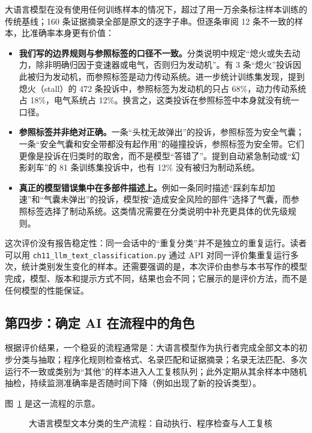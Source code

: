 大语言模型在没有使用任何训练样本的情况下，超过了用一万余条标注样本训练的传统基线；160 条证据摘录全部是原文的逐字子串。但逐条审阅 12 条不一致的样本，比准确率本身更有价值：

\begin{itemize}
  \item \textbf{我们写的边界规则与参照标签的口径不一致。}分类说明中规定“熄火或失去动力，除非明确归因于变速器或电气，否则归为发动机”。有 3 条“熄火”投诉因此被归为发动机，而参照标签是动力传动系统。进一步统计训练集发现，提到熄火（stall）的 472 条投诉中，参照标签为发动机的只占 68\%，动力传动系统占 18\%，电气系统占 12\%。换言之，这类投诉在参照标签中本身就没有统一口径。
  \item \textbf{参照标签并非绝对正确。}一条“头枕无故弹出”的投诉，参照标签为安全气囊；一条“安全气囊和安全带都没有起作用”的碰撞投诉，参照标签为安全带。它们更像是投诉在归类时的取舍，而不是模型“答错了”。提到自动紧急制动或“幻影刹车”的 81 条训练集投诉中，也有 12\% 没有被归为制动系统。
  \item \textbf{真正的模型错误集中在多部件描述上。}例如一条同时描述“踩刹车却加速”和“气囊未弹出”的投诉，模型按“造成安全风险的部件”选择了气囊，而参照标签选择了制动系统。这类情况需要在分类说明中补充更具体的优先级规则。
\end{itemize}

这次评价没有报告稳定性：同一会话中的“重复分类”并不是独立的重复运行。读者可以用 \texttt{ch11\_llm\_text\_classification.py} 通过 API 对同一评价集重复运行多次，统计类别发生变化的样本。还需要强调的是，本次评价由参与本书写作的模型完成，模型、版本和提示方式不同，结果也会不同；它展示的是评价方法，而不是任何模型的性能保证。

\subsection{第四步：确定 AI 在流程中的角色}

根据评价结果，一个稳妥的流程通常是：大语言模型作为执行者完成全部文本的初步分类与抽取；程序化规则检查格式、名录匹配和证据摘录；名录无法匹配、多次运行不一致或类别为“其他”的样本进入人工复核队列；此外定期从其余样本中随机抽检，持续监测准确率是否随时间下降（例如出现了新的投诉类型）。

图~\ref{fig:ch11_review} 是这一流程的示意。

\begin{figure}[H]
  \centering
  \caption{大语言模型文本分类的生产流程：自动执行、程序检查与人工复核}
  \label{fig:ch11_review}
\end{figure}

